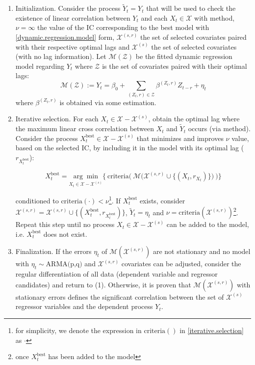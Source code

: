 \documentclass[a4paper]{easychair}
\begin{document}
\begin{enumerate}
    \item Initialization. Consider the process $\tilde{Y}_t=Y_t$ that will be used to check the existence of linear correlation between $Y_t$ and each $X_t\in \mathcal{X}$ with \cite{cryer2008time} method, $\nu=\infty$ the value of the IC corresponding to the best model with \ref{dynamic.regression.model} form, $\mathcal{X}^{(s,r)}$ the set of selected covariates paired with their respective optimal lags and $\mathcal{X}^{(s)}$ the set of selected covariates (with no lag information). Let $\mathcal{M}(\mathcal{Z})$ be the fitted dynamic regression model regarding $Y_t$ where $\mathcal{Z}$ is the set of covariates paired with their optimal lags:
    \[ \mathcal{M}(\mathcal{Z}) := Y_t = \beta_0 + \sum_{(Z_t, r)\in\mathcal{Z}} \beta^{(Z_t, r)} Z_{t-r} + \eta_t\]
    \noindent where $\beta^{(Z_t, r)}$ is obtained via some estimation.

    \item Iterative selection. For each $X_t\in\mathcal{X}-\mathcal{X}^{(s)}$, obtain the optimal lag where the maximum linear cross correlation between $X_t$ and $\tilde{Y}_t$ occurs (via \cite{cryer2008time} method). Consider the process $X_t^\text{best}\in\mathcal{X}-\mathcal{X}^{(s)}$ that minimizes and improves $\nu$ value, based on the selected IC, by including it in the model with its optimal lag ($r_{X_t^\text{best}}$):
    
    \begin{equation}\label{iterative.selection}
        X^\text{best}_t =  \underset{X_t\in\mathcal{X}-\mathcal{X}^{(s)}}{\arg\min} \Bigg\{ \ \text{criteria}\Bigg(\ \mathcal{M}\Big(\mathcal{X}^{(s,r)} \cup \big\{(X_t, r_{X_t})\big\} \Big) \ \Bigg) \Bigg\}
    \end{equation}

    \noindent conditioned to $\text{criteria}(\cdot) < \nu$\footnote{for simplicity, we denote the expression in $\text{criteria}()$ in \ref{iterative.selection} as $\cdot$}. 
    If $X^{\text{best}}_t$ exists, consider $\mathcal{X}^{(s,r)} = \mathcal{X}^{(s,r)}  \cup \{(X_t^\text{best}, r_{X_t^\text{best}})\}$, $\tilde{Y}_t = \eta_t$ and $\nu=\text{criteria}(\mathcal{X}^{(s,r)})$\footnote{once $X_t^\text{best}$ has been added to the model }. Repeat this step until no process $X_t\in\mathcal{X}-\mathcal{X}^{(s)}$ can be added to the model, i.e. $X_t^\text{best}$ does not exist.

    \item Finalization. If the errors $\eta_t$ of $\mathcal{M}(\mathcal{X}^{(s,r)})$ are not stationary and no model with $\eta_t\sim\text{ARMA(p,q)}$ and $\mathcal{X}^{(s,r)}$ covariates can be adjusted, consider the regular differentiation of all data (dependent variable and regressor candidates) and return to (1). Otherwise, it is proven that  $\mathcal{M}(\mathcal{X}^{(s,r)})$ with stationary errors defines the significant correlation between the set of $\mathcal{X}^{(s)}$ regressor variables and the dependent process $Y_t$.
\end{enumerate}
\end{document}
